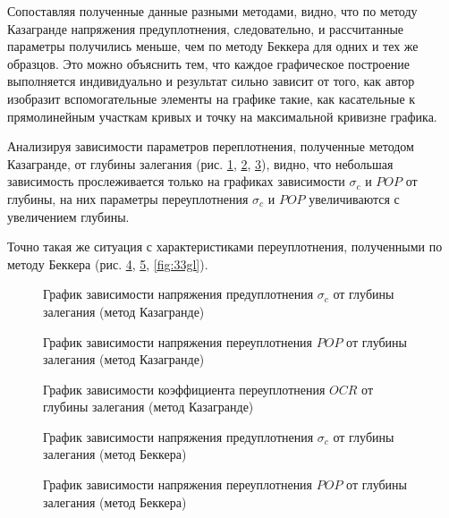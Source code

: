 Сопоставляя полученные данные разными методами, 
видно, что по методу Казагранде напряжения предуплотнения, 
следовательно, и рассчитанные параметры получились 
меньше, чем по методу Беккера для одних и тех же образцов.
Это можно объяснить тем, что каждое графическое построение 
выполняется индивидуально и результат сильно зависит от 
того, как автор изобразит вспомогательные элементы 
на графике такие, как касательные к прямолинейным участкам 
кривых и точку на максимальной кривизне графика.

Анализируя зависимости параметров переплотнения, 
полученные методом Казагранде, от глубины залегания 
(рис. \ref{fig:1gl}, \ref{fig:2gl}, \ref{fig:3gl}), 
видно, что небольшая зависимость прослеживается только  
на графиках зависимости $\sigma_c$ и $POP$ от глубины, на 
них параметры переуплотнения $\sigma_c$ и $POP$ увеличиваются 
с увеличением глубины. 

Точно такая же ситуация с характеристиками 
переуплотнения, полученными по методу Беккера (рис. \ref{fig:11gl}, \ref{fig:22gl}, \ref{fig:33gl}).

\begin{figure}[ht]
  \caption{График зависимости напряжения предуплотнения $\sigma_c$ от глубины залегания (метод Казагранде)}\label{fig:1gl}
\end{figure}

\begin{figure}[h!]
  \caption{График зависимости напряжения переуплотнения $POP$ от глубины залегания (метод Казагранде)}\label{fig:2gl}
\end{figure}

\begin{figure}[h!]
  \caption{График зависимости коэффициента переуплотнения $OCR$ от глубины залегания (метод Казагранде)}\label{fig:3gl}
\end{figure}

\begin{figure}[h!]
  \caption{График зависимости напряжения предуплотнения $\sigma_c$ от глубины залегания (метод Беккера)}\label{fig:11gl}
\end{figure}

\begin{figure}[h!]
  \caption{График зависимости напряжения переуплотнения $POP$ от глубины залегания (метод Беккера)}\label{fig:22gl}
\end{figure}

